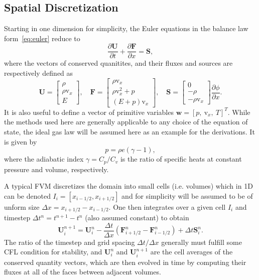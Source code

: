 \subsection{Spatial Discretization}
\label{subsec:space}

Starting in one dimension for simplicity, the Euler equations in the balance law form~\eqref{eq:euler} reduce to
\begin{equation} \label{eq:euler1D}
\frac{\partial \mathbf{U}}{\partial t}+\frac{\partial \mathbf{F}}{\partial x}=\mathbf{S},
\end{equation}
where the vectors of conserved quanitites, and their fluxes and sources are respectively defined as
\begin{equation}
\mathbf{U}=
\begin{bmatrix}
\rho \\ \rho \mathrm{v}_x \\ E
\end{bmatrix}
,\quad \mathbf{F}=
\begin{bmatrix}
\rho \mathrm{v}_x \\ \rho \mathrm{v}_x^2+p \\ (E+p)\mathrm{v}_x
\end{bmatrix}
,\quad \mathbf{S}=
\begin{bmatrix}
0 \\ -\rho \\ -\rho \mathrm{v}_x
\end{bmatrix} \frac{\partial \phi}{\partial x}.
\end{equation}
It is also useful to define a vector of primitive variables $\mathbf{w}=[p,\ \mathrm{v}_x,\ T]^T$. While the methods used here are generally applicable to any choice of the equation of state, the ideal gas law will be assumed here as an example for the derivations. It is given by
\begin{equation}
p=\rho e(\gamma-1),
\end{equation}
where the adiabatic index $\gamma=C_p/C_v$ is the ratio of specific heats at constant pressure and volume, respectively.

A typical FVM discretizes the domain into small cells (i.e. volumes) which in 1D can be denoted $I_i=[x_{i-1/2},x_{i+1/2}]$ and for simplicity will be assumed to be of unform size $\Delta x=x_{i+1/2}-x_{i-1/2}$. One then integrates over a given cell $I_i$ and timestep $\Delta t^n=t^{n+1}-t^n$ (also assumed constant) to obtain
\begin{equation}
\mathbf{U}_i^{n+1}=\mathbf{U}_i^n-\frac{\Delta t}{\Delta x}\left(\mathbf{F}_{i+1/2}^n-\mathbf{F}_{i-1/2}^n\right)+\Delta t\mathbf{S}_i^n.
\end{equation}
The ratio of the timestep and grid spacing $\Delta t/\Delta x$ generally must fulfill some CFL condition for stability, and $\mathbf{U}_i^n$ and $\mathbf{U}_i^{n+1}$ are the cell averages of the conserved quantity vectors, which are then evolved in time by computing their fluxes at all of the faces between adjacent volumes.

